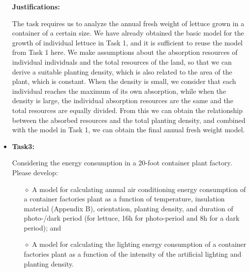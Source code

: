 \begin{itemize}
    \textbf{Justifications:}
    
    \begin{comment}
        任务要求我们分析一定尺寸的集装箱内生菜生长的年鲜重。我们在任务一中已经得到了单个生菜生长的基本模型，在这里对任务1中的模型进行再次利用即可。我们对单个个体的吸收资源和土地的总资源进行假设，因此可以得出适宜的种植密度，该密度也和工厂的面积相关，该面积为常熟。当密度较小时，我们认为每个个体达到自身吸收的最大值，而当密度较大时，个体吸收资源相同，均分总资源。由此我们可以得到吸收资源与种植总密度的关系，结合任务一中的模型，就可以得到最终的年鲜重模型。
    \end{comment}

    The task requires us to analyze the annual fresh weight of lettuce grown in a container of a certain size. We have already obtained the basic model for the growth of individual lettuce in Task 1, and it is sufficient to reuse the model from Task 1 here. We make assumptions about the absorption resources of individual individuals and the total resources of the land, so that we can derive a suitable planting density, which is also related to the area of the plant, which is constant. When the density is small, we consider that each individual reaches the maximum of its own absorption, while when the density is large, the individual absorption resources are the same and the total resources are equally divided. From this we can obtain the relationship between the absorbed resources and the total planting density, and combined with the model in Task 1, we can obtain the final annual fresh weight model.
    
    \item \textbf{Task3: }
    
   Considering the energy consumption in a 20-foot container plant factory. Please develop: 
    \begin{itemize}
       \item[$\diamond$]A model for calculating annual air conditioning energy consumption of a container factories plant as a function of temperature, insulation material (Appendix B), orientation, planting density, and duration of photo-/dark period (for lettuce, 16h for photo-period and 8h for a dark period); and
       \item[$\diamond$]A model for calculating the lighting energy consumption of a container factories plant as a function of the intensity of the artificial lighting and planting density.
    \end{itemize}



\end{itemize}
